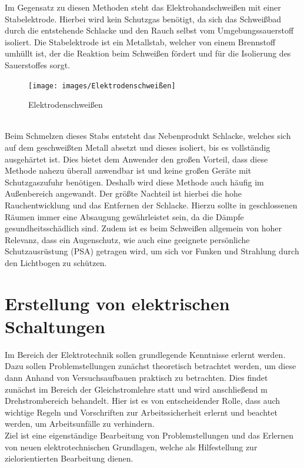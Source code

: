 Im Gegensatz zu diesen Methoden steht das Elektrohandschweißen mit
einer Stabelektrode. Hierbei wird kein Schutzgas benötigt, da sich das Schweißbad durch die entstehende Schlacke und den Rauch selbst vom 
Umgebungssauerstoff isoliert. Die Stabelektrode ist ein Metallstab, welcher von einem Brennstoff umhüllt ist, der die Reaktion beim Schweißen fördert und 
für die Isolierung des Sauerstoffes sorgt.
\begin{figure}[h]
    \centering
    \texttt{[image: images/Elektrodenschweißen]}
    \caption[Elektrodenschweißen]{Elektrodenschweißen \autocite{E-Hand}}
    \label{fig:Elektrodenschweißen}
\end{figure}
\\Beim Schmelzen dieses Stabs entsteht das Nebenprodukt Schlacke, welches sich auf dem geschweißten Metall 
absetzt und dieses isoliert, bis es vollständig ausgehärtet ist.  Dies bietet dem Anwender den großen Vorteil, dass diese Methode nahezu überall anwendbar
ist und keine großen Geräte mit Schutzgaszufuhr benötigen. Deshalb wird diese Methode auch häufig im Außenbereich angewandt. Der größte Nachteil ist 
hierbei die hohe Rauchentwicklung und das Entfernen der Schlacke. Hierzu sollte in geschlossenen Räumen immer eine Absaugung gewährleistet sein, da die
Dämpfe gesundheitsschädlich sind.  Zudem ist es beim Schweißen allgemein von hoher Relevanz, dass ein Augenschutz, wie auch eine geeignete persönliche 
Schutzausrüstung (PSA) getragen wird, um sich vor Funken und Strahlung durch den Lichtbogen zu schützen. \autocite{Spath.2023}
\clearpage


\section{Erstellung von elektrischen Schaltungen}

Im Bereich der Elektrotechnik sollen grundlegende Kenntnisse erlernt werden. Dazu sollen Problemstellungen zunächst theoretisch 
betrachtet werden, um diese dann Anhand von Versuchsaufbauen praktisch zu betrachten. Dies findet zunächst im Bereich der Gleichstromlehre statt und 
wird anschließend m Drehstrombereich behandelt. Hier ist es von entscheidender Rolle, dass auch wichtige Regeln und Vorschriften zur Arbeitssicherheit 
erlernt und beachtet werden, um Arbeitsunfälle zu verhindern.
\\
Ziel ist eine eigenständige Bearbeitung von Problemstellungen und das Erlernen von neuen elektrotechnischen Grundlagen, welche als Hilfestellung zur 
zielorientierten Bearbeitung dienen. 
\clearpage

